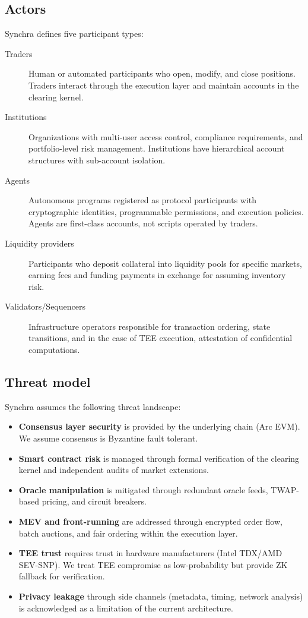 \documentclass[11pt,a4paper]{article}
\begin{document}
\subsection{Actors}

Synchra defines five participant types:

\begin{description}
  \item[Traders] Human or automated participants who open, modify, and close positions. Traders interact through the execution layer and maintain accounts in the clearing kernel.
  \item[Institutions] Organizations with multi-user access control, compliance requirements, and portfolio-level risk management. Institutions have hierarchical account structures with sub-account isolation.
  \item[Agents] Autonomous programs registered as protocol participants with cryptographic identities, programmable permissions, and execution policies. Agents are first-class accounts, not scripts operated by traders.
  \item[Liquidity providers] Participants who deposit collateral into liquidity pools for specific markets, earning fees and funding payments in exchange for assuming inventory risk.
  \item[Validators/Sequencers] Infrastructure operators responsible for transaction ordering, state transitions, and in the case of TEE execution, attestation of confidential computations.
\end{description}

\subsection{Threat model}

Synchra assumes the following threat landscape:

\begin{itemize}
  \item \textbf{Consensus layer security} is provided by the underlying chain (Arc EVM). We assume consensus is Byzantine fault tolerant.
  \item \textbf{Smart contract risk} is managed through formal verification of the clearing kernel and independent audits of market extensions.
  \item \textbf{Oracle manipulation} is mitigated through redundant oracle feeds, TWAP-based pricing, and circuit breakers.
  \item \textbf{MEV and front-running} are addressed through encrypted order flow, batch auctions, and fair ordering within the execution layer.
  \item \textbf{TEE trust} requires trust in hardware manufacturers (Intel TDX/AMD SEV-SNP). We treat TEE compromise as low-probability but provide ZK fallback for verification.
  \item \textbf{Privacy leakage} through side channels (metadata, timing, network analysis) is acknowledged as a limitation of the current architecture.
\end{itemize}
\end{document}
